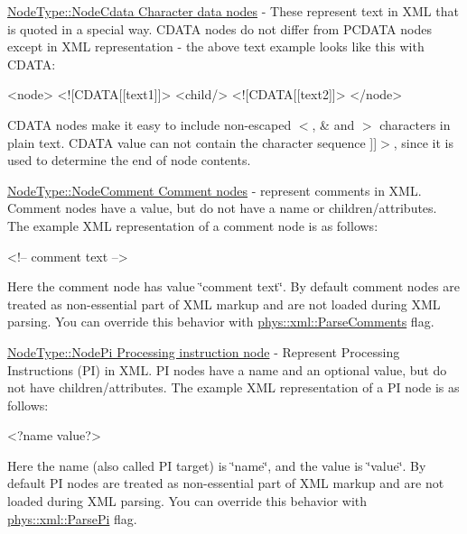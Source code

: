 \begin{DoxyItemize}
\item \hyperlink{namespacephys_1_1xml_a668b0cc666a9d49f7c7222a7552115d3}{NodeType::NodeCdata Character data nodes} -\/ These represent text in XML that is quoted in a special way. CDATA nodes do not differ from PCDATA nodes except in XML representation -\/ the above text example looks like this with CDATA: 
\begin{DoxyCode}
 <node> <![CDATA[[text1]]> <child/> <![CDATA[[text2]]> </node> 
\end{DoxyCode}
 CDATA nodes make it easy to include non-\/escaped $<$, \& and $>$ characters in plain text. CDATA value can not contain the character sequence \mbox{]}\mbox{]}$>$, since it is used to determine the end of node contents. \par

\item \hyperlink{namespacephys_1_1xml_a668b0cc666a9d49f7c7222a7552115d3}{NodeType::NodeComment Comment nodes} -\/ represent comments in XML. Comment nodes have a value, but do not have a name or children/attributes. The example XML representation of a comment node is as follows: 
\begin{DoxyCode}
 <!-- comment text --> 
\end{DoxyCode}
 Here the comment node has value \char`\"{}comment text\char`\"{}. By default comment nodes are treated as non-\/essential part of XML markup and are not loaded during XML parsing. You can override this behavior with \hyperlink{namespacephys_1_1xml_a83ba30a7bee5a0fd4aa2f6136c8793fc}{phys::xml::ParseComments} flag. \par

\item \hyperlink{namespacephys_1_1xml_a668b0cc666a9d49f7c7222a7552115d3}{NodeType::NodePi Processing instruction node} -\/ Represent Processing Instructions (PI) in XML. PI nodes have a name and an optional value, but do not have children/attributes. The example XML representation of a PI node is as follows: 
\begin{DoxyCode}
 <?name value?> 
\end{DoxyCode}
 Here the name (also called PI target) is \char`\"{}name\char`\"{}, and the value is \char`\"{}value\char`\"{}. By default PI nodes are treated as non-\/essential part of XML markup and are not loaded during XML parsing. You can override this behavior with \hyperlink{namespacephys_1_1xml_a4d324954fc33d50155bae04587da13e2}{phys::xml::ParsePi} flag. \par


\end{DoxyItemize}
